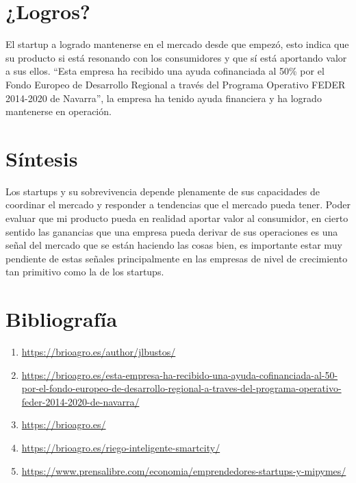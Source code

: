 \documentclass{article}
\begin{document}
\section{¿Logros?}
El startup a logrado mantenerse en el mercado desde que empezó, esto indica que su producto si está resonando con los consumidores y que sí está aportando valor a sus ellos. ``Esta empresa ha recibido una ayuda cofinanciada al 50\% por el Fondo Europeo de Desarrollo Regional a través del Programa Operativo FEDER 2014-2020 de Navarra'', la empresa ha tenido ayuda financiera y ha logrado mantenerse en operación.



\section{Síntesis}
Los startups y su sobrevivencia depende plenamente de sus capacidades de coordinar el mercado y responder a tendencias que el mercado pueda tener. Poder evaluar que mi producto pueda en realidad aportar valor al consumidor, en cierto sentido las ganancias que una empresa pueda derivar de sus operaciones es una señal del mercado que se están haciendo las cosas bien, es importante estar muy pendiente de estas señales principalmente en las empresas de nivel de crecimiento tan primitivo como la de los startups.


\section{Bibliografía}
\begin{enumerate}
    \item \url{https://brioagro.es/author/jlbustos/}
    \item \url{https://brioagro.es/esta-empresa-ha-recibido-una-ayuda-cofinanciada-al-50-por-el-fondo-europeo-de-desarrollo-regional-a-traves-del-programa-operativo-feder-2014-2020-de-navarra/}
    \item \url{https://brioagro.es/}
    \item \url{https://brioagro.es/riego-inteligente-smartcity/}
    \item \url{https://www.prensalibre.com/economia/emprendedores-startups-y-mipymes/}
\end{enumerate}
\end{document}
